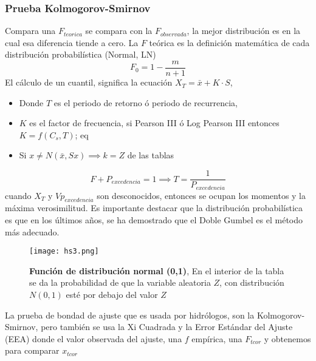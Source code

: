 \subsubsection{Prueba Kolmogorov-Smirnov}
Compara una $F_{teorica}$ se compara con la $F_{observada}$, la mejor distribución es en la cual esa diferencia tiende a cero.
La $F$ teórica es la definición matemática de cada distribución probabilística (Normal, LN)
\begin{equation}
    F_0 = 1 - \frac{m}{n + 1}
\end{equation}
El cálculo de un cuantil, significa la ecuación $X_T=\bar{x}+K\cdot S$, 
\begin{notation}
    \begin{itemize}
        \item Donde $T$ es el periodo de retorno ó periodo de recurrencia,
        \item $K$ es el factor de frecuencia, si Pearson III ó Log Pearson III entonces $K=f\left(C_s,T\right)$; eq
        \item Si $x\neq N\left(\bar{x},Sx\right)\implies k=Z$ de las tablas
    \end{itemize}
\end{notation}
\begin{equation}
    F + P_{excedencia} = 1\implies T = \frac{1}{P_{excedencia}}
\end{equation}
cuando $X_T$ y $Vp_{excedencia}$ son desconocidos, entonces se ocupan los momentos y la máxima verosimilitud. Es importante destacar que la distribución probabilística es que en los últimos años, se ha demostrado que el Doble Gumbel es el método más adecuado.
\begin{figure}[h!]
\centering
  \texttt{[image: hs3.png]}
  \caption{\textbf{Función de distribución normal (0,1)}, En el interior de la tabla se da la probabilidad de que la variable aleatoria $Z$, con distribución $N(0,1)$ esté por debajo del valor $Z$}
  \label{hs3}
\end{figure}
La prueba de bondad de ajuste que es usada por hidrólogos, son la Kolmogorov-Smirnov, pero también se usa la Xi Cuadrada y la Error Estándar del Ajuste (EEA) donde el valor observada del ajuste, una $f$ empírica, una $F_{tcor}$ y obtenemos para comparar $x_{tcor}$

